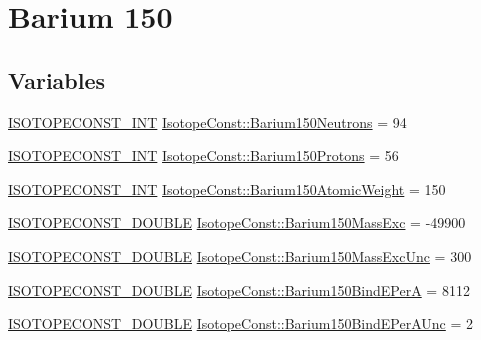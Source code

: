 \hypertarget{group___isotope_const-_barium-_ba150}{}\section{Barium 150}
\label{group___isotope_const-_barium-_ba150}
\subsection*{Variables}
\begin{DoxyCompactItemize}
\item 
\mbox{\hyperlink{group___isotope_const-_macros_ga5f18360b3e99483a35c32d789e62621c}{I\+S\+O\+T\+O\+P\+E\+C\+O\+N\+S\+T\+\_\+\+I\+NT}} \mbox{\hyperlink{group___isotope_const-_barium-_ba150_ga57fd39e55f0e895be0c99a252e3342ff}{Isotope\+Const\+::\+Barium150\+Neutrons}} = 94
\item 
\mbox{\hyperlink{group___isotope_const-_macros_ga5f18360b3e99483a35c32d789e62621c}{I\+S\+O\+T\+O\+P\+E\+C\+O\+N\+S\+T\+\_\+\+I\+NT}} \mbox{\hyperlink{group___isotope_const-_barium-_ba150_ga5471e614a1887ad8b5c49298d8f9e420}{Isotope\+Const\+::\+Barium150\+Protons}} = 56
\item 
\mbox{\hyperlink{group___isotope_const-_macros_ga5f18360b3e99483a35c32d789e62621c}{I\+S\+O\+T\+O\+P\+E\+C\+O\+N\+S\+T\+\_\+\+I\+NT}} \mbox{\hyperlink{group___isotope_const-_barium-_ba150_ga35b9da9bd2f16b9ec3f08a672fe87e9c}{Isotope\+Const\+::\+Barium150\+Atomic\+Weight}} = 150
\item 
\mbox{\hyperlink{group___isotope_const-_macros_ga8f45a7272ce02c0b4c65c44636ed719a}{I\+S\+O\+T\+O\+P\+E\+C\+O\+N\+S\+T\+\_\+\+D\+O\+U\+B\+LE}} \mbox{\hyperlink{group___isotope_const-_barium-_ba150_ga7f6b598bbb0e2bbdf39c6c592983c1cd}{Isotope\+Const\+::\+Barium150\+Mass\+Exc}} = -\/49900
\item 
\mbox{\hyperlink{group___isotope_const-_macros_ga8f45a7272ce02c0b4c65c44636ed719a}{I\+S\+O\+T\+O\+P\+E\+C\+O\+N\+S\+T\+\_\+\+D\+O\+U\+B\+LE}} \mbox{\hyperlink{group___isotope_const-_barium-_ba150_gac40f0dede30233039a5debfda95a3a93}{Isotope\+Const\+::\+Barium150\+Mass\+Exc\+Unc}} = 300
\item 
\mbox{\hyperlink{group___isotope_const-_macros_ga8f45a7272ce02c0b4c65c44636ed719a}{I\+S\+O\+T\+O\+P\+E\+C\+O\+N\+S\+T\+\_\+\+D\+O\+U\+B\+LE}} \mbox{\hyperlink{group___isotope_const-_barium-_ba150_gaaaba44210d66da014600a0690a7d495d}{Isotope\+Const\+::\+Barium150\+Bind\+E\+PerA}} = 8112
\item 
\mbox{\hyperlink{group___isotope_const-_macros_ga8f45a7272ce02c0b4c65c44636ed719a}{I\+S\+O\+T\+O\+P\+E\+C\+O\+N\+S\+T\+\_\+\+D\+O\+U\+B\+LE}} \mbox{\hyperlink{group___isotope_const-_barium-_ba150_ga5483f3eb5f49ed31b19260ad7c4a4d28}{Isotope\+Const\+::\+Barium150\+Bind\+E\+Per\+A\+Unc}} = 2

\end{DoxyCompactItemize}
